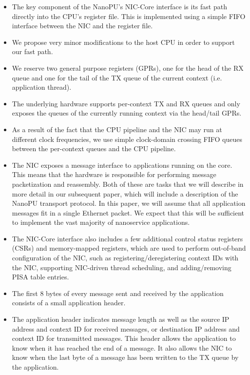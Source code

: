 \begin{itemize}
    \item The key component of the NanoPU's NIC-Core interface is its fast path directly into the CPU's register file. This is implemented using a simple FIFO interface between the NIC and the register file.
    \item We propose very minor modifications to the host CPU in order to support our fast path.
    \item We reserve two general purpose registers (GPRs), one for the head of the RX queue and one for the tail of the TX queue of the current context (i.e. application thread).
    \item The underlying hardware supports per-context TX and RX queues and only exposes the queues of the currently running context via the head/tail GPRs.
    \item As a result of the fact that the CPU pipeline and the NIC may run at different clock frequencies, we use simple clock-domain crossing FIFO queues between the per-context queues and the CPU pipeline.
    \item The NIC exposes a message interface to applications running on the core. This means that the hardware is responsible for performing message packetization and reassembly. Both of these are tasks that we will describe in more detail in our subsequent paper, which will include a description of the NanoPU transport protocol. In this paper, we will assume that all application messages fit in a single Ethernet packet. We expect that this will be sufficient to implement the vast majority of nanoservice applications.
    \item The NIC-Core interface also includes a few additional control status registers (CSRs) and memory-mapped registers, which are used to perform out-of-band configuration of the NIC, such as registering/deregistering context IDs with the NIC, supporting NIC-driven thread scheduling, and adding/removing PISA table entries.
    \item The first 8 bytes of every message sent and received by the application consists of a small application header.
    \item The application header indicates message length as well as the source IP address and context ID for received messages, or destination IP address and context ID for transmitted messages. This header allows the application to know when it has reached the end of a message. It also allows the NIC to know when the last byte of a message has been written to the TX queue by the application.
\end{itemize}

